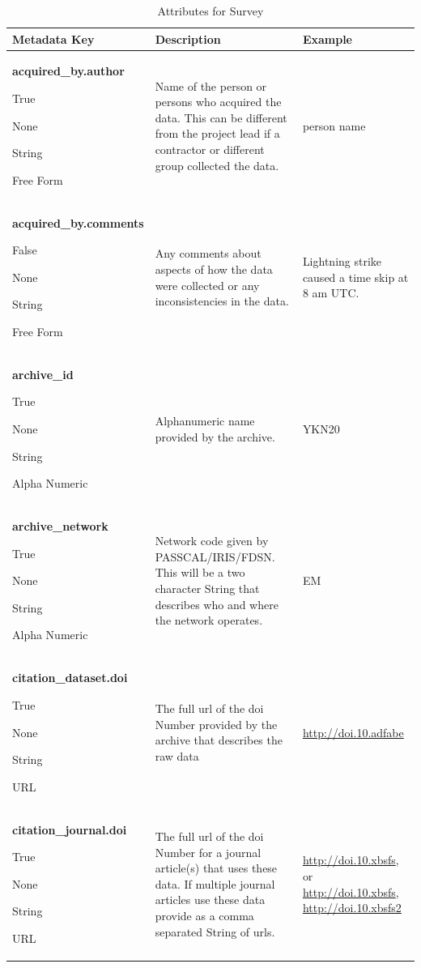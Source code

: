 \documentclass[12pt]{article}
\newcommand{\entry}[7]{
	\textbf{#1} 
	\begin{itemize}[topsep=5pt,itemsep=-.1pt,parsep=-2pt,partopsep=0pt,labelwidth=2em,align=left,itemindent=1em]
		\begin{small}
			\item[Required:] #2
			\item[Units:] #3
			\item[Type:] #4
			\item[Style:] #5
		\end{small}
	\end{itemize} & #6 & #7 \\ \midrule}
\begin{document}
\begin{table}[h!]
	\caption[Attributes for Survey]{Attributes for Survey }
	\begin{tabular}{p{}>{\raggedright}p{}p{}}
	\textbf{Metadata Key} & \textbf{Description} & \textbf{Example} \\ \toprule
	\entry{acquired\_by.author}{True}{None}{String}{Free Form}{Name of the person or persons who acquired the data.  This can be different from the project lead if a contractor or different group collected the data.}{person name}
	\entry{acquired\_by.comments}{False}{None}{String}{Free Form}{Any comments about aspects of how the data were collected or any inconsistencies in the data.}{Lightning strike caused a time skip at 8 am UTC.}
	\entry{archive\_id}{True}{None}{String}{Alpha Numeric}{Alphanumeric name provided by the archive.}{YKN20}
	\entry{archive\_network}{True}{None}{String}{Alpha Numeric}{Network code given by PASSCAL/IRIS/FDSN.  This will be a two character String that describes who and where the network operates.}{EM}
	\entry{citation\_dataset.doi}{True}{None}{String}{URL}{The full url of the doi Number provided by the archive that describes the raw data}{\url{http://doi.10.adfabe}}
	\entry{citation\_journal.doi}{True}{None}{String}{URL}{The full url of the doi Number for a journal article(s) that uses these data.  If multiple journal articles use these data provide as a comma separated String of urls. }{\url{http://doi.10.xbsfs}, or \url{http://doi.10.xbsfs}, \url{http://doi.10.xbsfs2}}
	\end{tabular}
	\label{tab:survey}
\end{table} 

\clearpage
\newpage
\end{document}
